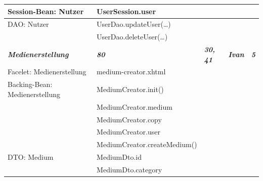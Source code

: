 \documentclass{article}
\begin{document}
\begin{longtable}{|l|l|l|l|l|}
\hline
Session-Bean: Nutzer                    & UserSession.user                         &                           &                             &                        \\ 
\hline
DAO: Nutzer                             & UserDao.updateUser(…)                    &                           &                             &                        \\ 
\hline
                                        & UserDao.deleteUser(…)                    &                           &                             &                        \\ 
\hline
\textbf{\textit{Medienerstellung}}      & \textbf{\textit{80}}                     & \textbf{\textit{30, 41}}  & \textbf{\textit{Ivan}}      & \textbf{\textit{5}}    \\ 
\hline
Facelet: Medienerstellung               & medium-creator.xhtml                     &                           &                             &                        \\ 
\hline
Backing-Bean: Medienerstellung          & MediumCreator.init()                     &                           &                             &                        \\ 
\hline
                                        & MediumCreator.medium                     &                           &                             &                        \\ 
\hline
                                        & MediumCreator.copy                       &                           &                             &                        \\ 
\hline
                                        & MediumCreator.user                       &                           &                             &                        \\ 
\hline
                                        & MediumCreator.createMedium()             &                           &                             &                        \\ 
\hline
DTO: Medium                             & MediumDto.id                             &                           &                             &                        \\ 
\hline
                                        & MediumDto.category                       &                           &                             &                        \\ 

\end{longtable}
\end{document}
